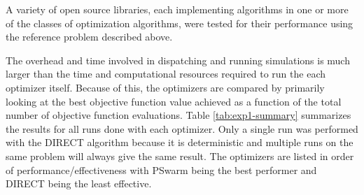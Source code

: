A variety of open source libraries, each implementing algorithms in one or
more of the classes of optimization algorithms, were tested for their
performance using the reference problem described above.

The overhead and time involved in dispatching and running \Cyclus{} simulations
is much larger than the time and computational resources required to run the
each optimizer itself. Because of this, the optimizers are compared by
primarily looking at the best objective function value achieved as a function
of the total number of objective function evaluations.  Table
\ref{tab:exp1-summary} summarizes the results for all runs done with each
optimizer.  Only a single run was performed with the DIRECT algorithm because
it is deterministic and multiple runs on the same problem will always give the
same result.  The optimizers are listed in order of performance/effectiveness
with PSwarm being the best performer and DIRECT being the least effective.


